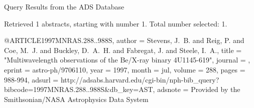 Query Results from the ADS Database


Retrieved 1 abstracts, starting with number 1.  Total number selected: 1.

@ARTICLE{1997MNRAS.288..988S,
   author = {{Stevens}, J.~B. and {Reig}, P. and {Coe}, M.~J. and {Buckley}, D.~A.~H. and 
	{Fabregat}, J. and {Steele}, I.~A.},
    title = "{Multiwavelength observations of the Be/X-ray binary 4U1145-619}",
  journal = {\mnras},
   eprint = {astro-ph/9706110},
     year = 1997,
    month = jul,
   volume = 288,
    pages = {988-994},
   adsurl = {http://adsabs.harvard.edu/cgi-bin/nph-bib_query?bibcode=1997MNRAS.288..988S&db_key=AST},
  adsnote = {Provided by the Smithsonian/NASA Astrophysics Data System}
}


